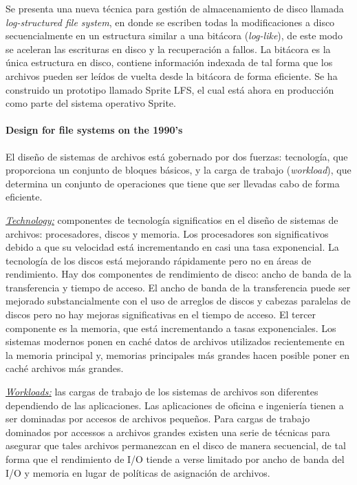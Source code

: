 Se presenta una nueva técnica para gestión de almacenamiento de disco llamada \emph{log-structured file system}, en donde se escriben todas la modificaciones a disco secuencialmente en un estructura similar a una bitácora (\emph{log-like}), de este modo se aceleran las escrituras en disco y la recuperación a fallos. La bitácora es la única estructura en disco, contiene información indexada de tal forma que los archivos pueden ser leídos de vuelta desde la bitácora de forma eficiente. Se ha construido un prototipo llamado Sprite LFS, el cual está  ahora en producción como parte del sistema operativo Sprite.

\paragraph{\textnormal{\textbf{Design for file systems on the 1990's}}}
El diseño de sistemas de archivos está gobernado por dos fuerzas: tecnología, que proporciona un conjunto de bloques básicos, y la carga de trabajo (\emph{workload}), que determina un conjunto de operaciones que tiene que ser llevadas cabo de forma eficiente. 

\underline{\emph{Technology:}} componentes de tecnología significatios en el diseño de sistemas de archivos: procesadores, discos y memoria. Los procesadores son significativos debido a que su velocidad está incrementando en casi una tasa exponencial. La tecnología de los discos está mejorando rápidamente pero no en áreas de rendimiento. Hay dos componentes de rendimiento de disco: ancho de banda de la transferencia y tiempo de acceso. El ancho de banda de la transferencia puede ser mejorado substancialmente con el uso de arreglos de discos y cabezas paralelas de discos pero no hay mejoras significativas en el tiempo de acceso. El tercer componente es la memoria, que está incrementando a tasas exponenciales. Los sistemas modernos ponen en caché datos de archivos utilizados recientemente en la memoria principal y, memorias principales más grandes hacen posible poner en caché archivos más grandes. 

\underline{\emph{Workloads:}} las cargas de trabajo de los sistemas de archivos son diferentes dependiendo de las aplicaciones. Las aplicaciones de oficina e ingeniería tienen a ser dominadas por accesos de archivos pequeños. Para cargas de trabajo dominados por accessos a archivos grandes existen una serie de técnicas para asegurar que tales archivos permanezcan en el disco de manera secuencial, de tal forma que el rendimiento de I/O tiende a verse limitado por ancho de banda del I/O y memoria en lugar de políticas de asignación de archivos. 

